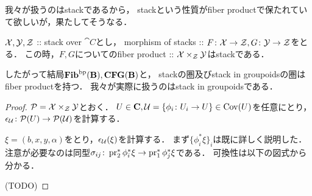 \documentclass[a4paper, dvipdfmx]{jsarticle}
\begin{document}
我々が扱うのはstackであるから，
stackという性質がfiber productで保たれていて欲しいが，果たしてそうなる．
\begin{Prop}
    $\mathcal{X}, \mathcal{Y}, \mathcal{Z}$ :: stack over $\cat{C}$とし，
    morphism of stacks :: $F \colon \mathcal{X} \to \mathcal{Z}, G \colon \mathcal{Y} \to \mathcal{Z}$をとる．
    この時，$F, G$についてのfiber product :: $\mathcal{X} \times_{\mathcal{Z}} \mathcal{Y}$はstackである．
\end{Prop}
したがって結局$\mathbf{Fib}^{\mathrm{bp}}(\mathbf{B}), \mathbf{CFG}(\mathbf{B})$と，
stackの圏及びstack in groupoidsの圏はfiber productを持つ．
我々が実際に扱うのはstack in groupoidsである．
\begin{proof}
    $\mathcal{P}=\mathcal{X} \times_{\mathcal{Z}} \mathcal{Y}$とおく．
    $U \in \mathbf{C}, \mathcal{U}=\{\phi_i \colon U_i \to U\} \in \operatorname{Cov}(U)$を任意にとり，
    $\epsilon_{\mathcal{U}} \colon \mathcal{P}(U) \to \mathcal{P}(\mathcal{U})$を計算する．

    $\xi=(b, x, y, \alpha)$をとり，$\epsilon_{\mathcal{U}}(\xi)$を計算する．
    まず$\{\phi_i^*\xi\}_i$は既に詳しく説明した．
    注意が必要なのは同型$\sigma_{ij} \colon \operatorname{pr}_2^*\phi_i^*\xi \to \operatorname{pr}_1^*\phi_j^*\xi$である．
    可換性は以下の図式から分かる．
    \begin{center}
    \end{center}
    
    (TODO)

\end{proof}
\end{document}
